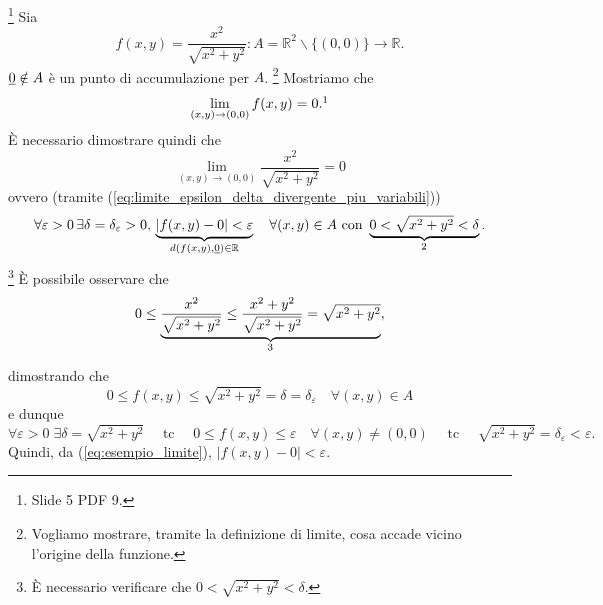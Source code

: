 \begin{example}\footnote{Slide 5 PDF 9.}
    Sia
    \begin{equation*}
        f(x,y)=\frac{x^2}{\sqrt{x^2+y^2}}\colon A=\mathbb R^2\backslash\{(0,0)\}\rightarrow\mathbb R.
    \end{equation*}
    $\uline 0\notin A$ è un punto di accumulazione per $A$.
    \footnote{Vogliamo mostrare, tramite la definizione di limite, cosa accade vicino l'origine della funzione.} Mostriamo che
    \begin{equation*}
        \lim_{(x,y)\rightarrow(0,0)}f(x,y)=0.\footnotemark
    \end{equation*}
    È necessario dimostrare quindi che
    \begin{equation*}
        \lim_{(x,y)\rightarrow(0,0)}\frac{x^2}{\sqrt{x^2+y^2}}=0
    \end{equation*}
    ovvero (tramite (\ref{eq:limite_epsilon_delta_divergente_piu_variabili}))
    \begin{equation*}
        \forall\varepsilon>0\,\exists\delta=\delta_\varepsilon>0,\, \underbrace{|f(x,y)-0|<\varepsilon}_{d(f(x,y),\uline 0)\in\mathbb R}\quad \forall(x,y)\in A \text{ con } \underbrace{0<\sqrt{x^2+y^2}<\delta}_{\footnotemark}.
    \end{equation*}
    \footnote{È necessario verificare che $0<\sqrt{x^2+y^2}<\delta$.} È possibile osservare che
    \begin{equation*}
        0\leq\underbrace{\frac{x^2}{\sqrt{x^2+y^2}}\leq\frac{x^2+y^2}{\sqrt{x^2+y^2}}=\sqrt{x^2+y^2}}_{\footnotemark},
    \end{equation*}
    dimostrando che
    \begin{equation}\label{eq:esempio_limite}
        0\leq f(x,y)\leq \sqrt{x^2+y^2}=\delta=\delta_\varepsilon\quad \forall(x,y)\in A
    \end{equation}
    e dunque
    \begin{equation*}
        \forall\varepsilon>0\;\exists\delta = \sqrt{x^2+y^2}\quad \text{ tc }\quad 0\leq f(x,y)\leq\varepsilon\quad\forall(x,y)\neq(0,0)\quad\text{ tc }\quad \sqrt{x^2+y^2}=\delta_\varepsilon<\varepsilon.
    \end{equation*}
    Quindi, da (\ref{eq:esempio_limite}), $|f(x,y)-0|<\varepsilon$.
\end{example}

